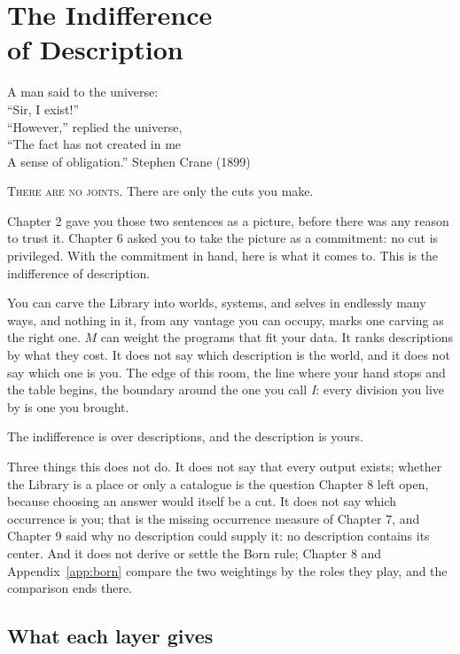 \chapter[The Indifference of Description]{The Indifference\\of Description}

\chapterepigraph
{A man said to the universe:\\
``Sir, I exist!''\\
``However,'' replied the universe,\\
``The fact has not created in me\\
A sense of obligation.''}
{Stephen Crane (1899)}

\noindent \textsc{There are no joints.} There are only the cuts you make.

Chapter 2 gave you those two sentences as a picture, before there was any reason to trust it. Chapter 6 asked you to take the picture as a commitment: no cut is privileged. With the commitment in hand, here is what it comes to. This is the indifference of description.

You can carve the Library into worlds, systems, and selves in endlessly many ways, and nothing in it, from any vantage you can occupy, marks one carving as the right one. $M$ can weight the programs that fit your data. It ranks descriptions by what they cost. It does not say which description is the world, and it does not say which one is you. The edge of this room, the line where your hand stops and the table begins, the boundary around the one you call \emph{I}: every division you live by is one you brought.

The indifference is over descriptions, and the description is yours.

Three things this does not do. It does not say that every output exists; whether the Library is a place or only a catalogue is the question Chapter 8 left open, because choosing an answer would itself be a cut. It does not say which occurrence is you; that is the missing occurrence measure of Chapter 7, and Chapter 9 said why no description could supply it: no description contains its center. And it does not derive or settle the Born rule; Chapter 8 and Appendix~\ref{app:born} compare the two weightings by the roles they play, and the comparison ends there.

\section*{What each layer gives}

